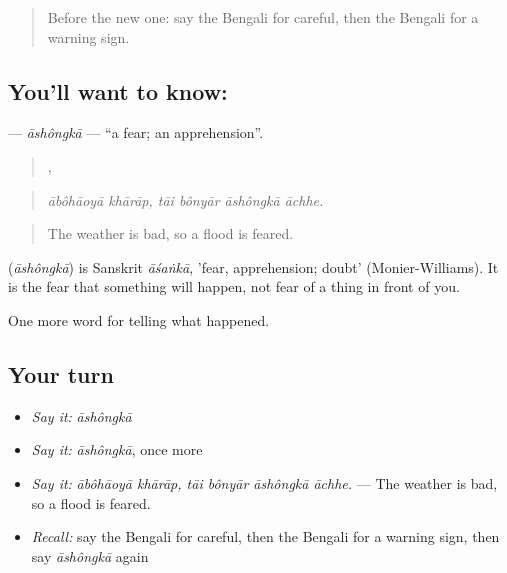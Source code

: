 \label{lesson:BN-C294-ashongka}



\begin{quote}
Before the new one: say the Bengali for careful, then the Bengali for a warning sign.
\end{quote}

\subsection*{You'll want to know: }
\textbf{} — \emph{āshôngkā} — \textquotedblleft{}a fear; an apprehension\textquotedblright{}.

\begin{quote}
 ,    
\end{quote}

\begin{quote}
\emph{ābôhāoyā khārāp, tāi bônyār āshôngkā āchhe.}
\end{quote}

\begin{quote}
The weather is bad, so a flood is feared.
\end{quote}

\begin{cousinweb}
\textbf{} (\emph{āshôngkā}) is Sanskrit \emph{āśaṅkā}, 'fear, apprehension; doubt' (Monier-Williams). It is the fear that something will happen, not fear of a thing in front of you.
\end{cousinweb}

\begin{grammarlens}[title={What you've built}]
One more word for telling what happened.
\end{grammarlens}

\subsection*{Your turn}
\begin{itemize}
\raggedright
  \item \emph{Say it:} \emph{āshôngkā}
  \item \emph{Say it:} \emph{āshôngkā}, once more
  \item \emph{Say it:} \emph{ābôhāoyā khārāp, tāi bônyār āshôngkā āchhe.} — The weather is bad, so a flood is feared.
  \item \emph{Recall:} say the Bengali for careful, then the Bengali for a warning sign, then say \emph{āshôngkā} again
\end{itemize}

